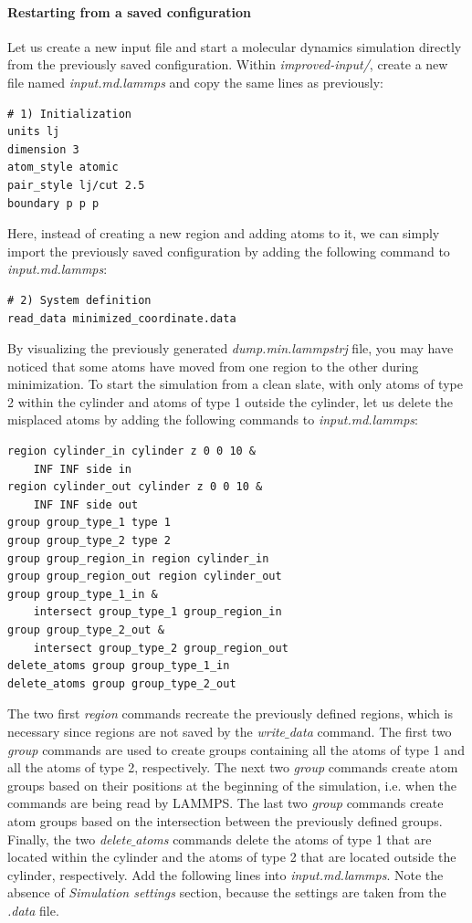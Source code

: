 \documentclass[9pt,tutorial]{livecoms}
\begin{document}
\paragraph{Restarting from a saved configuration}
Let us create a new input file and start a molecular dynamics simulation directly from the previously saved configuration. Within \textit{improved-input/}, create a new file named \textit{input.md.lammps} and copy the same lines as previously:
{\normalsize \begin{verbatim}
# 1) Initialization
units lj
dimension 3
atom_style atomic
pair_style lj/cut 2.5
boundary p p p
\end{verbatim}}
Here, instead of creating a new region and adding atoms to it, we can simply import the previously saved configuration by adding the following command to \textit{input.md.lammps}:
{\normalsize \begin{verbatim}
# 2) System definition
read_data minimized_coordinate.data
\end{verbatim}}
By visualizing the previously generated \textit{dump.min.lammpstrj} file, you may have noticed that some atoms have moved from one region to the other during minimization. To start the simulation from a clean slate, with only atoms of type 2 within the cylinder and atoms of type
1 outside the cylinder, let us delete the misplaced atoms by adding the following commands to \textit{input.md.lammps}:
{\normalsize \begin{verbatim}
region cylinder_in cylinder z 0 0 10 &
    INF INF side in
region cylinder_out cylinder z 0 0 10 &
    INF INF side out
group group_type_1 type 1
group group_type_2 type 2
group group_region_in region cylinder_in
group group_region_out region cylinder_out
group group_type_1_in & 
    intersect group_type_1 group_region_in
group group_type_2_out &
    intersect group_type_2 group_region_out
delete_atoms group group_type_1_in
delete_atoms group group_type_2_out
\end{verbatim}}
The two first \textit{region} commands recreate the previously defined regions, which is necessary since regions are not saved by the \textit{write$\_$data} command. The first two \textit{group} commands are used to create groups containing all the atoms of type 1 and all the atoms of type 2, respectively.
The next two \textit{group} commands create atom groups based on their
positions at the beginning of the simulation, i.e. when the commands are being read by LAMMPS. The last two \textit{group} commands create atom groups based on the intersection between the previously defined groups. Finally, the two \textit{delete$\_$atoms} commands delete the atoms of type 1 that are located within the cylinder and the atoms of type 2 that are located outside the cylinder, respectively. Add the following lines into \textit{input.md.lammps}. Note the absence of \textit{Simulation settings} section, because the settings are taken from the \textit{.data} file.
\end{document}
